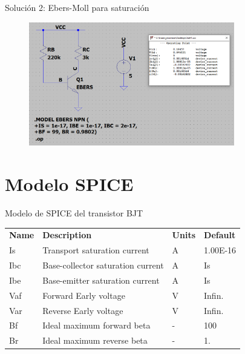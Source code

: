 \documentclass[t,aspectratio=169]{beamer}
\begin{document}
\begin{frame}{Solución 2: Ebers-Moll para saturación}

\begin{figure}
    \centering
    \includegraphics[width=0.8\textwidth]{figuras/solution_3.png}
\end{figure}

\end{frame}


\section{Modelo SPICE}
\begin{frame}{Modelo de SPICE del transistor BJT}

\begin{table}[H]
    \centering
    \begin{tabular}{llll}
        \textbf{Name}    &\textbf{Description}      &\textbf{Units}  &\textbf{Default}    \\
        Is      &Transport saturation current       &A      &1.00E-16   \\
        Ibc     &Base-collector saturation current  &A      &Is         \\
        Ibe     &Base-emitter saturation current    &A      &Is         \\
        Vaf     &Forward Early voltage              &V      &Infin.     \\
        Var     &Reverse Early voltage              &V      &Infin.     \\
        Bf      &Ideal maximum forward beta         &-      &100        \\
        Br      &Ideal maximum reverse beta         &-      &1.         \\
    \end{tabular}
\end{table}


\end{frame}
\end{document}
